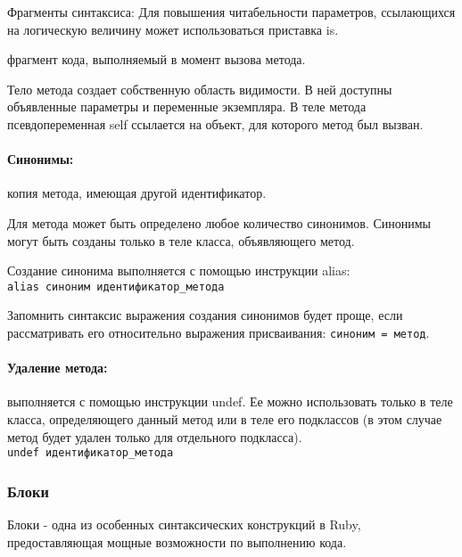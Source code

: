 \begin{keylist}{Фрагменты синтаксиса:}
  Для повышения читабельности параметров, ссылающихся на логическую величину может использоваться приставка is.

   фрагмент кода, выполняемый в момент вызова метода.

  Тело метода создает собственную область видимости. В ней доступны объявленные параметры и переменные экземпляра. В теле метода псевдопеременная self ссылается на объект, для которого метод был вызван.
  
\end{keylist}

\paragraph*{Синонимы:} копия метода, имеющая другой идентификатор.

Для метода может быть определено любое количество синонимов. Синонимы могут быть созданы только в теле класса, объявляющего метод.

Создание синонима выполняется с помощью инструкции alias:
\\\verb!alias синоним идентификатор_метода!

\begin{note}
Запомнить синтаксис выражения создания синонимов будет проще, если рассматривать его относительно выражения присваивания: \verb!синоним = метод!.
\end{note}

\paragraph*{Удаление метода:} выполняется с помощью инструкции undef. Ее можно использовать только в теле класса, определяющего данный метод или в теле его подклассов (в этом случае метод будет удален только для отдельного подкласса).
\\ \verb!undef идентификатор_метода!

\subsubsection*{Блоки}

Блоки - одна из особенных синтаксических конструкций в Ruby, предоставляющая мощные возможности по выполнению кода.

